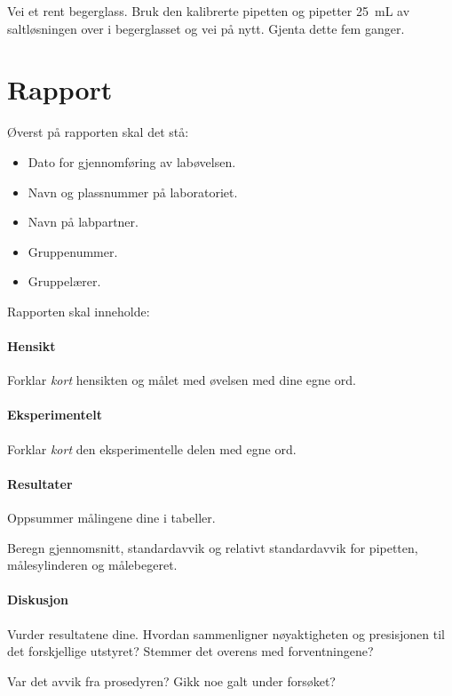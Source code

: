 \documentclass[hidelinks,12pt,norsk,a4paper,fleqn]{scrartcl}
\begin{document}
	Vei et rent begerglass. Bruk den kalibrerte pipetten og pipetter \SI{25}{mL} av saltløsningen over i begerglasset og vei på nytt. Gjenta dette fem ganger.
	
	\section{Rapport}
	Øverst på rapporten skal det stå:
	\begin{itemize}
		\item Dato for gjennomføring av labøvelsen.
		\item Navn og plassnummer på laboratoriet.
		\item Navn på labpartner.
		\item Gruppenummer.
		\item Gruppelærer.
	\end{itemize}

	Rapporten skal inneholde:
	\paragraph{Hensikt}
	Forklar \emph{kort} hensikten og målet med øvelsen med dine egne ord.
	
	\paragraph{Eksperimentelt}
	Forklar \emph{kort} den eksperimentelle delen med egne ord.
	
	\paragraph{Resultater}
	Oppsummer målingene dine i tabeller.
	
	Beregn gjennomsnitt, standardavvik og relativt standardavvik for pipetten, målesylinderen og målebegeret.
	
	\paragraph{Diskusjon}
	Vurder resultatene dine. Hvordan sammenligner nøyaktigheten og presisjonen til det forskjellige utstyret? Stemmer det overens med forventningene?
	
	Var det avvik fra prosedyren? Gikk noe galt under forsøket?
	
\end{document}
